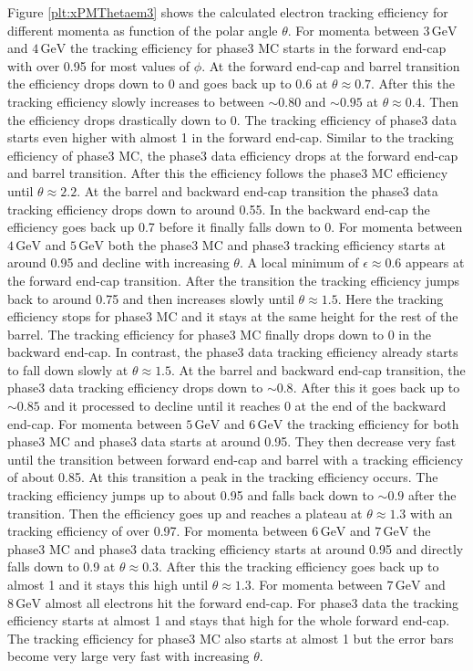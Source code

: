 \documentclass[a4paper,11pt,twosided,final,german,openbib,pdftex,listof=totoc,bibliography=totoc]{scrbook}
\begin{document}
Figure \ref{plt:xPMThetaem3} shows the calculated electron tracking efficiency for different momenta as function of the polar angle $\theta$.
For momenta between $3\,\textrm{GeV}$ and $4\,\textrm{GeV}$ the tracking efficiency for phase3 MC starts in the forward end-cap with over 0.95 for most values of $\phi$. At the forward end-cap and barrel transition the efficiency drops down to 0 and goes back up to 0.6 at $\theta \approx 0.7$. After this the tracking efficiency slowly increases to between $\sim 0.80$ and $\sim 0.95$ at $\theta \approx 0.4$. Then the efficiency drops drastically down to 0. The tracking efficiency of phase3 data starts even higher with almost 1 in the forward end-cap. Similar to the tracking efficiency of phase3 MC, the phase3 data efficiency drops at the forward end-cap and barrel transition. After this the efficiency follows the phase3 MC efficiency until $\theta \approx 2.2$. At the barrel and backward end-cap transition the phase3 data tracking efficiency drops down to around 0.55. In the backward end-cap the efficiency goes back up 0.7 before it finally falls down to 0.
For momenta between $4\,\textrm{GeV}$ and $5\,\textrm{GeV}$ both the phase3 MC and phase3 tracking efficiency starts at around 0.95 and decline with increasing $\theta$. A local minimum of $\epsilon \approx 0.6$ appears at the forward end-cap transition. After the transition the tracking efficiency jumps back to around 0.75 and then increases slowly until $\theta \approx 1.5$. Here the tracking efficiency stops for phase3 MC and it stays at the same height for the rest of the barrel. The tracking efficiency for phase3 MC finally drops down to 0 in the backward end-cap. In contrast, the phase3 data tracking efficiency already starts to fall down slowly at $\theta \approx 1.5$. At the barrel and backward end-cap transition, the phase3 data tracking efficiency drops down to $\sim0.8$. After this it goes back up to $\sim0.85$ and it processed to decline until it reaches 0 at the end of the backward end-cap.
For momenta between $5\,\textrm{GeV}$ and $6\,\textrm{GeV}$ the tracking efficiency for both phase3 MC and phase3 data starts at around 0.95. They then decrease very fast until the transition between forward end-cap and barrel with a tracking efficiency of about 0.85. At this transition a peak in the tracking efficiency occurs. The tracking efficiency jumps up to about 0.95 and falls back down to $\sim 0.9$ after the transition. Then the efficiency goes up and reaches a plateau at $\theta \approx 1.3$ with an tracking efficiency of over 0.97.
For momenta between $6\,\textrm{GeV}$ and $7\,\textrm{GeV}$ the phase3 MC and phase3 data tracking efficiency starts at around 0.95 and directly falls down to 0.9 at $\theta \approx 0.3$. After this the tracking efficiency goes back up to almost 1 and it stays this high until $\theta \approx 1.3$.
For momenta between $7\,\textrm{GeV}$ and $8\,\textrm{GeV}$ almost all electrons hit the forward end-cap. For phase3 data the tracking efficiency starts at almost 1 and stays that high for the whole forward end-cap. The tracking efficiency for phase3 MC also starts at almost 1 but the error bars become very large very fast with increasing $\theta$.
\end{document}
